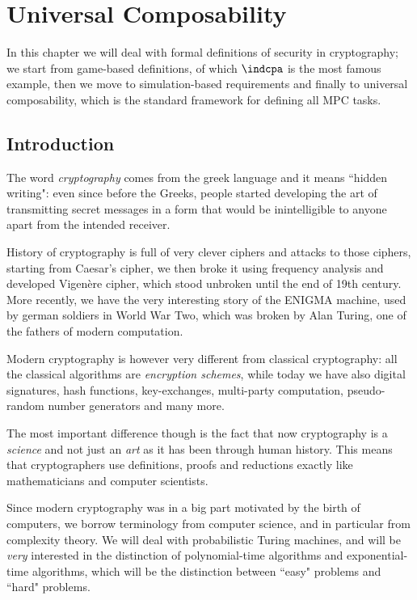 \chapter{Universal Composability}

In this chapter we will deal with formal definitions of security in cryptography; we start from game-based definitions, of which $\indcpa$ is the most famous example, then we move to simulation-based requirements and finally to universal composability, which is the standard framework for defining all MPC tasks.

\section{Introduction}
The word \emph{cryptography} comes from the greek language and it means ``hidden writing": even since before the Greeks, people started developing the art of transmitting secret messages in a form that would be inintelligible to anyone apart from the intended receiver.

History of cryptography is full of very clever ciphers and attacks to those ciphers, starting from Caesar's cipher, we then broke it using frequency analysis and developed Vigenère cipher, which stood unbroken until the end of 19th century. More recently, we have the very interesting story of the ENIGMA machine, used by german soldiers in World War Two, which was broken by Alan Turing, one of the fathers of modern computation.

Modern cryptography is however very different from classical cryptography: all the classical algorithms are \emph{encryption schemes}, while today we have also digital signatures, hash functions, key-exchanges, multi-party computation, pseudo-random number generators and many more.

The most important difference though is the fact that now cryptography is a \emph{science} and not just an \emph{art} as it has been through human history. This means that cryptographers use definitions, proofs and reductions exactly like mathematicians and computer scientists.

Since modern cryptography was in a big part motivated by the birth of computers, we borrow terminology from computer science, and in particular from complexity theory. We will deal with probabilistic Turing machines, and will be \emph{very} interested in the distinction of polynomial-time algorithms and exponential-time algorithms, which will be the distinction between ``easy" problems and ``hard" problems.

